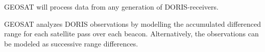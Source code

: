 \settowidth{\hangindent}{GEOSAT }
GEOSAT will process data from any generation of DORIS-receivers.

\settowidth{\hangindent}{GEOSAT }
GEOSAT analyzes DORIS observations by modelling the accumulated
differenced range for each satellite pass over each
beacon. Alternatively, the observations can be modeled as successive
range differences.

\endinput
